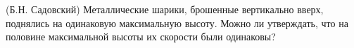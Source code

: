 (Б.Н. Садовский)
Металлические шарики, брошенные вертикально вверх, поднялись на
одинаковую максимальную высоту. Можно ли утверждать, что на половине
максимальной высоты их скорости были одинаковы?
